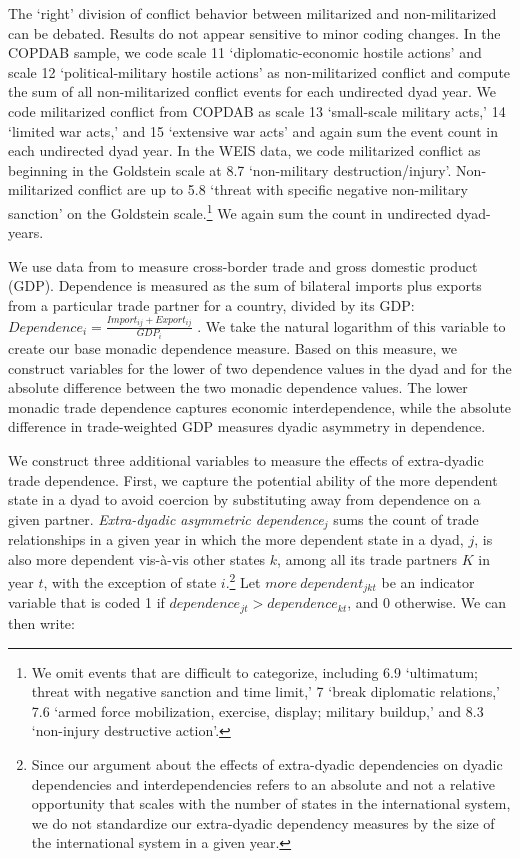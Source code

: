 \documentclass[12pt]{article}
\theoremstyle{hypothesis}
\begin{document}
The `right' division of conflict behavior between militarized and non-militarized can be debated. Results do not appear sensitive to minor coding changes. In the COPDAB sample, we code scale 11 `diplomatic-economic hostile actions' and scale 12 `political-military hostile actions' as non-militarized conflict and compute the sum of all non-militarized conflict events for each undirected dyad year. We code militarized conflict from COPDAB as scale 13 `small-scale military acts,' 14 `limited war acts,' and 15 `extensive war acts' and again sum the event count in each undirected dyad year. In the WEIS data, we code militarized conflict as beginning in the Goldstein scale at 8.7 `non-military destruction/injury'. Non-militarized conflict are up to 5.8 `threat with specific negative non-military sanction' on the Goldstein scale.\footnote{We omit events that are difficult to categorize, including 6.9 `ultimatum; threat with negative sanction and time limit,' 7 `break diplomatic relations,' 7.6 `armed force mobilization, exercise, display; military buildup,' and 8.3 `non-injury destructive action'.} We again sum the count in undirected dyad-years.

We use data from \citet{Gleditsch:2002} to measure cross-border trade and gross domestic product (GDP).  Dependence is measured as the sum of bilateral imports plus exports from a particular trade partner for a country, divided by its GDP: $Dependence_{i} = \frac{Import_{ij}+Export_{ij}}{GDP_{i}}$ \citep{Oneal:1996}. We take the natural logarithm of this variable to create our base monadic dependence measure. Based on this measure, we construct variables for the lower of two dependence values in the dyad and for the absolute difference between the two monadic dependence values. The lower monadic trade dependence captures economic interdependence, while the absolute difference in trade-weighted GDP measures dyadic asymmetry in dependence.

We construct three additional variables to measure the effects of extra-dyadic trade dependence. First, we capture the potential ability of the more dependent state in a dyad to avoid coercion by substituting away from dependence on a given partner.  {\it{Extra-dyadic asymmetric dependence}}$_{j}$ sums the count of trade relationships in a given year in which the more dependent state in a dyad, $j$, is also more dependent vis-{\`a}-vis other states $k$, among all its trade partners $K$ in year $t$, with the exception of state $i$.\footnote{Since our argument about the effects of extra-dyadic dependencies on dyadic dependencies and interdependencies refers to an absolute and not a relative opportunity that scales with the number of states in the international system, we do not standardize our extra-dyadic dependency measures by the size of the international system in a given year.} Let $more~dependent_{jkt}$ be an indicator variable that is coded 1 if $dependence_{jt} > dependence_{kt}$, and 0 otherwise. We can then write:
\end{document}
